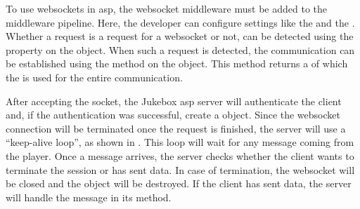 

To use websockets in \gls{asp}, the websocket middleware must be added to the middleware pipeline. Here, the developer can configure settings like the  and the . Whether a request is a request for a websocket or not, can be detected using the  property on the  object. When such a request is detected, the communication can be established using the  method on the  object. This method returns a  of which the  is used for the entire communication. \cite{aspWebsockets}

After accepting the socket, the Jukebox \gls{asp} server will authenticate the client and, if the authentication was successful, create a  object. Since the websocket connection will be terminated once the request is finished, the server will use a \enquote{keep-alive loop}, as shown in . This loop will wait for any message coming from the player. Once a message arrives, the server checks whether the client wants to terminate the session or has sent data. In case of termination, the websocket will be closed and the  object will be destroyed. If the client has sent data, the server will handle the message in its  method.

